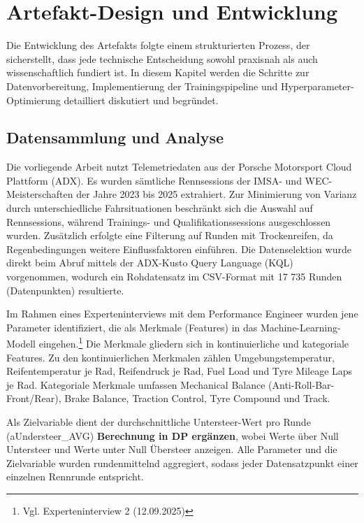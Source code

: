 \chapter{Artefakt-Design und Entwicklung}

Die Entwicklung des Artefakts folgte einem strukturierten Prozess, der sicherstellt, dass jede technische Entscheidung sowohl praxisnah als auch wissenschaftlich fundiert ist. In diesem Kapitel werden die Schritte zur Datenvorbereitung, Implementierung der Trainingspipeline und Hyperparameter-Optimierung detailliert diskutiert und begründet.

\section{Datensammlung und Analyse}

  Die vorliegende Arbeit nutzt Telemetriedaten aus der Porsche Motorsport Cloud Plattform (ADX). Es wurden sämtliche Rennsessions der IMSA- und WEC-Meisterschaften der Jahre 2023 bis 2025 extrahiert. Zur Minimierung von Varianz durch unterschiedliche Fahrsituationen beschränkt sich die Auswahl auf Rennsessions, während Trainings- und Qualifikationssessions ausgeschlossen wurden. Zusätzlich erfolgte eine Filterung auf Runden mit Trockenreifen, da Regenbedingungen weitere Einflussfaktoren einführen. Die Datenselektion wurde direkt beim Abruf mittels der ADX-Kusto Query Language (KQL) vorgenommen, wodurch ein Rohdatensatz im CSV-Format mit 17 735 Runden (Datenpunkten) resultierte.

  Im Rahmen eines Experteninterviews mit dem Performance Engineer wurden jene Parameter identifiziert, die als Merkmale (Features) in das Machine-Learning-Modell eingehen.\footnote{Vgl. Experteninterview 2 (12.09.2025)} Die Merkmale gliedern sich in kontinuierliche und kategoriale Features. Zu den kontinuierlichen Merkmalen zählen Umgebungstemperatur, Reifentemperatur je Rad, Reifendruck je Rad, Fuel Load und Tyre Mileage Laps je Rad. Kategoriale Merkmale umfassen Mechanical Balance (Anti-Roll-Bar-Front/Rear), Brake Balance, Traction Control, Tyre Compound und Track. 



  Als Zielvariable dient der durchschnittliche Untersteer-Wert pro Runde (aUndersteer\_AVG) \textbf{Berechnung in DP ergänzen}, wobei Werte über Null Untersteer und Werte unter Null Übersteer anzeigen. Alle Parameter und die Zielvariable wurden rundenmittelnd aggregiert, sodass jeder Datensatzpunkt einer einzelnen Rennrunde entspricht.


